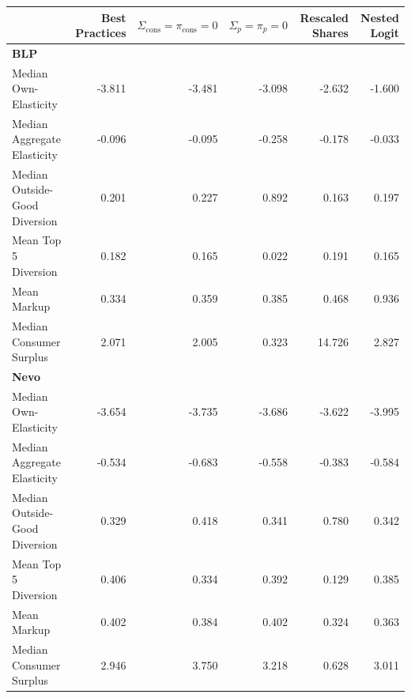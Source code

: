 \begin{tabular}{lrrrrr}
\midrule
                                                          &   Best Practices &   $\Sigma_{\text{cons}} = \pi_{\text{cons}} = 0 $ &   $\Sigma_p = \pi_p = 0 $ &   Rescaled Shares &   Nested Logit \\
\midrule
 \textbf{BLP} \\ \midrule Median Own-Elasticity           &           -3.811 &                                            -3.481 &                    -3.098 &            -2.632 &         -1.600 \\
 Median Aggregate Elasticity                              &           -0.096 &                                            -0.095 &                    -0.258 &            -0.178 &         -0.033 \\
 Median Outside-Good Diversion                            &            0.201 &                                             0.227 &                     0.892 &             0.163 &          0.197 \\
 Mean Top 5 Diversion                                     &            0.182 &                                             0.165 &                     0.022 &             0.191 &          0.165 \\
 Mean Markup                                              &            0.334 &                                             0.359 &                     0.385 &             0.468 &          0.936 \\
 Median Consumer Surplus                                  &            2.071 &                                             2.005 &                     0.323 &            14.726 &          2.827 \\
 \midrule \textbf{Nevo} \\ \midrule Median Own-Elasticity &           -3.654 &                                            -3.735 &                    -3.686 &            -3.622 &         -3.995 \\
 Median Aggregate Elasticity                              &           -0.534 &                                            -0.683 &                    -0.558 &            -0.383 &         -0.584 \\
 Median Outside-Good Diversion                            &            0.329 &                                             0.418 &                     0.341 &             0.780 &          0.342 \\
 Mean Top 5 Diversion                                     &            0.406 &                                             0.334 &                     0.392 &             0.129 &          0.385 \\
 Mean Markup                                              &            0.402 &                                             0.384 &                     0.402 &             0.324 &          0.363 \\
 Median Consumer Surplus                                  &            2.946 &                                             3.750 &                     3.218 &             0.628 &          3.011 \\
\midrule
\end{tabular}